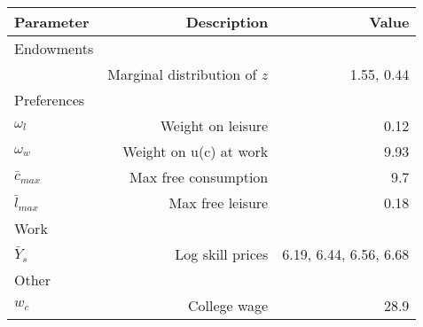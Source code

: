 \begin{tabular}{lrr}
\hline
Parameter & Description  & Value  \\ 
\hline
Endowments &   &   \\ 
 & Marginal distribution of $z$  & 1.55, 0.44  \\ 
Preferences &   &   \\ 
$\omega_{l}$ & Weight on leisure  & 0.12  \\ 
$\omega_{w}$ & Weight on u(c) at work  & 9.93  \\ 
$\bar{c}_{max}$ & Max free consumption  & 9.7  \\ 
$\bar{l}_{max}$ & Max free leisure  & 0.18  \\ 
Work &   &   \\ 
$\bar{Y}_{s}$ & Log skill prices  & 6.19, 6.44, 6.56, 6.68  \\ 
Other &   &   \\ 
$w_{c}$ & College wage  & 28.9  \\ 
\hline
\end{tabular}%
